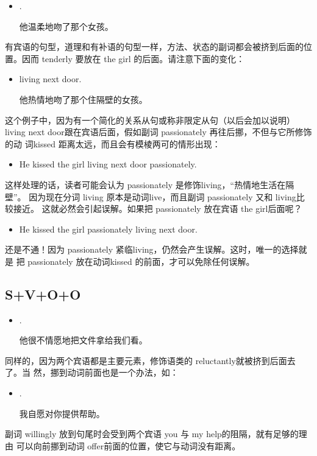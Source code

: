 \begin{itemize}
\item  {}   .

  他温柔地吻了那个女孩。
\end{itemize}
有宾语的句型，道理和有补语的句型一样，方法、状态的副词都会被挤到后面的位置。因而
tenderly 要放在 the girl 的后面。请注意下面的变化：
\begin{itemize}
\item  {}    living next door.

  他热情地吻了那个住隔壁的女孩。
\end{itemize}
这个例子中，因为有一个简化的关系从句或称非限定从句（以后会加以说明）living
next door跟在宾语后面，假如副词 passionately 再往后挪，不但与它所修饰的动
词kissed 距离太远，而且会有模棱两可的情形出现：
\begin{itemize}
\item  He kissed the girl living next door passionately.
\end{itemize}
这样处理的话，读者可能会认为 passionately 是修饰living，“热情地生活在隔壁”。
因为现在分词 living 原本是动词live，而且副词 passionately 又和 living比较接近。
这就必然会引起误解。如果把 passionately 放在宾语 the girl后面呢？
\begin{itemize}
\item  He kissed the girl passionately living next door.
\end{itemize}
还是不通！因为 passionately 紧临living，仍然会产生误解。这时，唯一的选择就是
把 passionately 放在动词kissed 的前面，才可以免除任何误解。

\subsection{S+V+O+O}

\begin{itemize}
\item  {}    .

  他很不情愿地把文件拿给我们看。
\end{itemize}

同样的，因为两个宾语都是主要元素，修饰语类的 reluctantly就被挤到后面去了。当
然，挪到动词前面也是一个办法，如：
\begin{itemize}
\item  {}    .

  我自愿对你提供帮助。
\end{itemize}
副词 willingly 放到句尾时会受到两个宾语 you 与 my help的阻隔，就有足够的理由
可以向前挪到动词 offer前面的位置，使它与动词没有距离。

